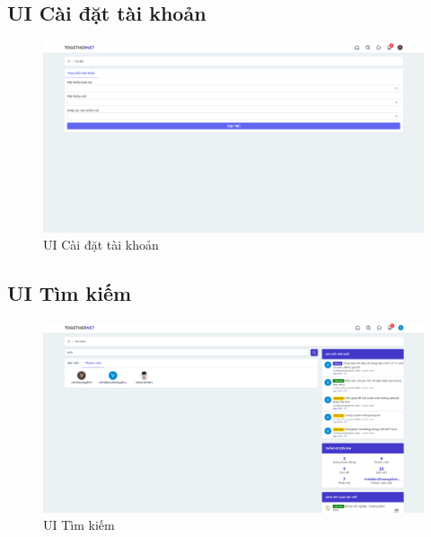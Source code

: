 \documentclass[../index.tex]{subfiles}
\begin{document}
    \subsection{UI Cài đặt tài khoản}
    \begin{figure}[H]
        \centering
        \includegraphics[width=1\linewidth]{
            figures/demo/account-setting-page.png
        }
        \caption{UI Cài đặt tài khoản}
    \end{figure}

    \subsection{UI Tìm kiếm}
    \begin{figure}[H]
        \centering
        \includegraphics[width=1\linewidth]{figures/demo/search-page.png}
        \caption{UI Tìm kiếm}
    \end{figure}
\end{document}
